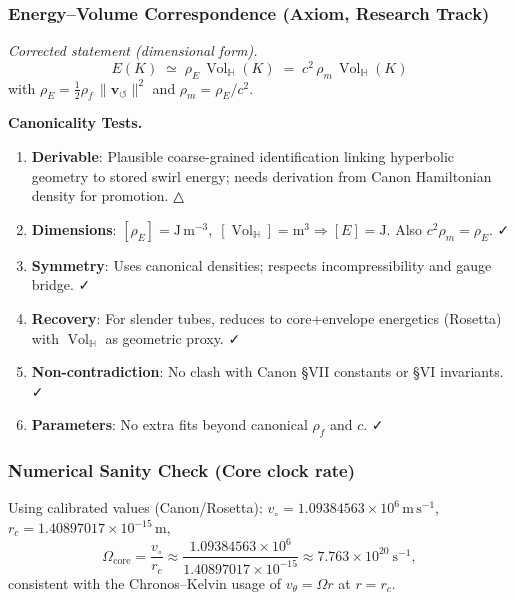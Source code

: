 \documentclass[10pt,reprint,aps,onecolumn,nofootinbib]{revtex4-2}
\newcommand{\Vol}{\operatorname{Vol}}   %
\begin{document}
\subsubsection{Energy–Volume Correspondence (Axiom, Research Track)}
\emph{Corrected statement (dimensional form).}
\[
    \boxed{\;E(K)\;\simeq\;\rho_{\!E}\,\Vol_{\!\mathbb{H}}(K)\;=\;c^{2}\,\rho_{\!m}\,\Vol_{\!\mathbb{H}}(K)\;}
\]
with $\rho_{\!E}=\tfrac12 \rho_{\!f}\,\lVert \mathbf{v}_{\!\boldsymbol{\circlearrowleft}}\rVert^{2}$ and $\rho_{\!m}=\rho_{\!E}/c^{2}$.

\textbf{Canonicality Tests.}
\begin{enumerate}
    \item \textbf{Derivable}: Plausible coarse-grained identification linking hyperbolic geometry to stored swirl energy; needs derivation from Canon Hamiltonian density for promotion. △
    \item \textbf{Dimensions}: $[\rho_{\!E}]=\mathrm{J\,m^{-3}},\; [\Vol_{\!\mathbb{H}}]=\mathrm{m^3}\Rightarrow [E]=\mathrm{J}$. Also $c^{2}\rho_{\!m}=\rho_{\!E}$. ✓
    \item \textbf{Symmetry}: Uses canonical densities; respects incompressibility and gauge bridge. ✓
    \item \textbf{Recovery}: For slender tubes, reduces to core+envelope energetics (Rosetta) with $\Vol_{\!\mathbb{H}}$ as geometric proxy. ✓
    \item \textbf{Non-contradiction}: No clash with Canon §VII constants or §VI invariants. ✓
    \item \textbf{Parameters}: No extra fits beyond canonical $\rho_{\!f}$ and $c$. ✓
\end{enumerate}

\subsubsection{Numerical Sanity Check (Core clock rate)}
Using calibrated values (Canon/Rosetta): $v_\circ=1.09384563\times 10^{6}\,\mathrm{m\,s^{-1}}$,
$r_c=1.40897017\times 10^{-15}\,\mathrm{m}$,
\[
    \Omega_{\text{core}}=\frac{v_\circ}{r_c}\approx
    \frac{1.09384563\times 10^{6}}{1.40897017\times 10^{-15}}
    \approx 7.763\times 10^{20}\ \mathrm{s^{-1}},
\]
consistent with the Chronos–Kelvin usage of $v_\theta=\Omega r$ at $r=r_c$.

\end{document}
